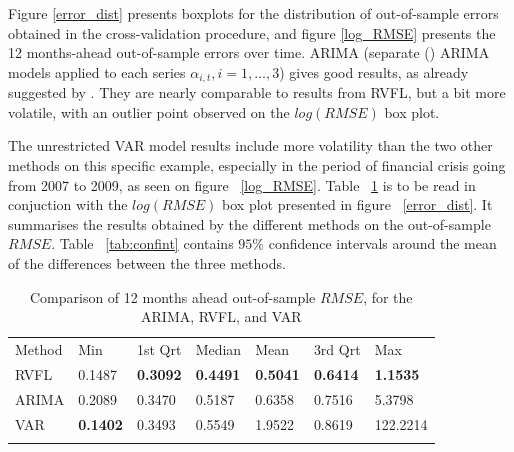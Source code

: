 Figure \ref{error_dist} presents boxplots for the distribution of out-of-sample errors obtained in the cross-validation procedure, and figure \ref{log_RMSE} presents the 12 months-ahead out-of-sample errors over time. ARIMA (separate (\cite{hyndman2008automatic}) ARIMA models applied to each series $\alpha_{i, t}, i = 1, \ldots, 3$) gives good results, as already suggested by  \cite{diebold2006forecasting}. They are nearly comparable to results from RVFL, but a bit more volatile, with an outlier point observed on the $log(RMSE)$ box plot. 

\medskip

The unrestricted VAR model results include more volatility than the two other methods on this specific  example, especially in the period of financial crisis going from 2007 to 2009, as seen on figure ~\ref{log_RMSE}. Table ~\ref{tab:benchmark} is to be read in conjuction with the $log(RMSE)$ box plot presented in figure ~\ref{error_dist}. It summarises the results obtained by the different methods on the out-of-sample $RMSE$. Table ~\ref{tab:confint} contains $95\%$ confidence intervals around the mean of the differences between the three methods.

\medskip

\begin{table}
\begin{center}
\caption{Comparison of 12 months ahead out-of-sample $RMSE$, for the ARIMA, RVFL, and VAR}
\label{tab:benchmark}       %
\begin{tabular}{lllllll}
\hline\noalign{\smallskip}
Method & Min & 1st Qrt  & Median & Mean  & 3rd Qrt  & Max  \\
\noalign{\smallskip}\hline\noalign{\smallskip}
  RVFL & 0.1487 & \textbf{0.3092} & \textbf{0.4491} & \textbf{0.5041} & \textbf{0.6414} & \textbf{1.1535} \\
  ARIMA & 0.2089 & 0.3470 & 0.5187 & 0.6358 & 0.7516 & 5.3798\\
  VAR & \textbf{0.1402} & 0.3493 & 0.5549 & 1.9522  & 0.8619 & 122.2214 \\
\noalign{\smallskip}\hline
\end{tabular}
\end{center}
\end{table}


